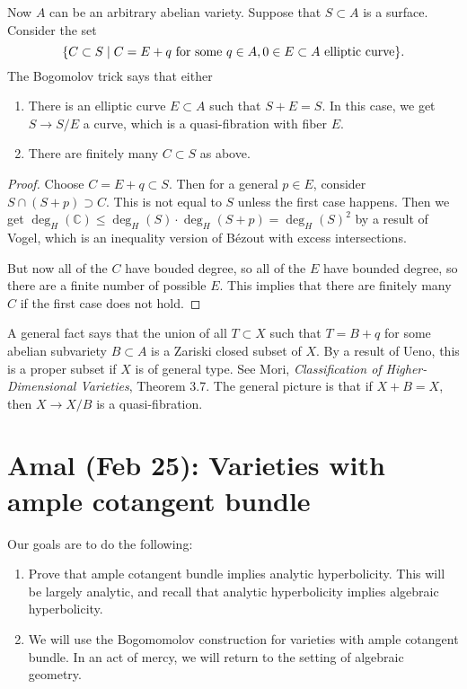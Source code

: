 \documentclass[leqno, openany]{memoir}
\theoremstyle{definition}
\theoremstyle{remark}
\theoremstyle{plain}
\theoremstyle{definition}
\theoremstyle{remark}
\newcommand{\C}{\mathbb{C}}
\begin{document}
Now $A$ can be an arbitrary abelian variety. Suppose that $S \subset A$ is a surface. Consider the set
\[ \qty{C \subset S \mid C = E + q \text{ for some }q \in A, 0 \in E \subset A \text{ elliptic curve}}. \]
The Bogomolov trick says that either
\begin{enumerate}[(1)]
    \item There is an elliptic curve $E \subset A$ such that $S + E = S$. In this case, we get $S \to S/E$ a curve, which is a quasi-fibration with fiber $E$.
    \item There are finitely many $C \subset S$ as above.
\end{enumerate}

\begin{proof}
    Choose $C = E + q \subset S$. Then for a general $p \in E$, consider $S \cap (S + p) \supset C$. This is not equal to $S$ unless the first case happens. Then we get $\deg_H(\C) \leq \deg_H(S) \cdot \deg_H(S+p) = \deg_H(S)^2$ by a result of Vogel, which is an inequality version of B\'ezout with excess intersections.

    But now all of the $C$ have bouded degree, so all of the $E$ have bounded degree, so there are a finite number of possible $E$. This implies that there are finitely many $C$ if the first case does not hold.
\end{proof}

A general fact says that the union of all $T \subset X$ such that $T = B + q$ for some abelian subvariety $B \subset A$ is a Zariski closed subset of $X$. By a result of Ueno, this is a proper subset if $X$ is of general type. See Mori, \textit{Classification of Higher-Dimensional Varieties}, Theorem 3.7. The general picture is that if $X + B = X$, then $X \to X/B$ is a quasi-fibration.

\chapter{Amal (Feb 25): Varieties with ample cotangent bundle}%

Our goals are to do the following:
\begin{enumerate}[(1)]
    \item Prove that ample cotangent bundle implies analytic hyperbolicity. This will be largely analytic, and recall that analytic hyperbolicity implies algebraic hyperbolicity.
    \item We will use the Bogomomolov construction for varieties with ample cotangent bundle. In an act of mercy, we will return to the setting of algebraic geometry.
\end{enumerate}
\end{document}
